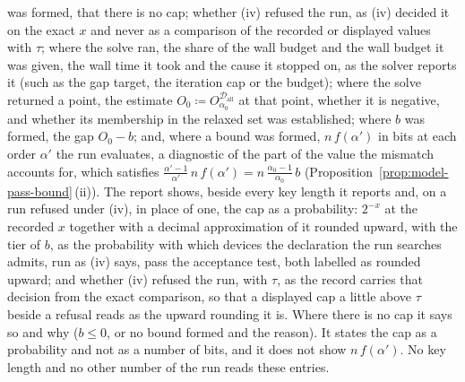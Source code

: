 \begin{requirement}
\begin{enumerate}[label=(\roman*),leftmargin=2.4em]
  was formed, that there is no cap; whether (iv) refused the run, as (iv)
  decided it on the exact $x$ and never as a comparison of the recorded or
  displayed values with $\tau$; where the
  solve ran, the share of the wall budget and the wall
  budget it was given, the wall time it took and the cause it stopped on, as the solver
  reports it (such as the gap target, the iteration cap or the budget);
  where the solve returned a point, the
  estimate $O_0\coloneqq O^{\mathcal{D}_{\mathrm{all}}}_{\alpha_0}$ at that
  point, whether it is negative, and whether its membership in the relaxed set was established;
  where $b$ was formed, the gap $O_0-b$; and, where a bound was formed,
  $n\,f(\alpha')$ in bits at each order $\alpha'$ the run evaluates, a
  diagnostic of the part of the value the mismatch accounts for, which
  satisfies $\frac{\alpha'-1}{\alpha'}\,n\,f(\alpha')
  =n\,\frac{\alpha_0-1}{\alpha_0}\,b$
  (Proposition~\ref{prop:model-pass-bound}\,(ii)). The report shows, beside
  every key length it reports and, on a run refused under (iv), in place of
  one, the cap as a probability: $2^{-x}$ at the recorded $x$ together with
  a decimal approximation of it rounded upward, with the tier of $b$, as
  the probability with which devices the declaration the run searches
  admits, run as (iv) says, pass the acceptance test, both labelled as
  rounded upward; and whether (iv) refused the run, with $\tau$, as the
  record carries that decision from the exact comparison, so that a
  displayed cap a little above $\tau$ beside a refusal reads as the
  upward rounding it is. Where there is no cap it says so and why
  ($b\le0$, or no bound formed and the reason). It states the cap as a
  probability and not as a number of bits, and it does not show
  $n\,f(\alpha')$. No key length and no other number of the run reads
  these entries.
\end{enumerate}
\end{requirement}
